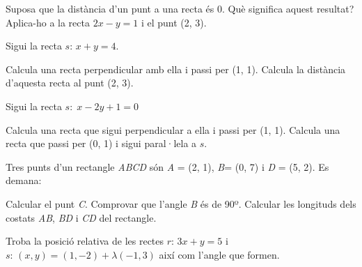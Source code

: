 \begin{activitats}
\begin{mylist}
		
		\exer  Suposa que la distància d'un punt a una recta és 0. Què significa aquest resultat? Aplica-ho a la recta $2x-y=1$ i el punt (2, 3).
		
		
		\exer  Sigui la recta $s:\, x+y=4$. 
		\begin{tasks}
			\task  Calcula una recta perpendicular amb ella i passi per (1, 1). 
			\task  Calcula la distància d'aquesta recta al punt (2, 3).
		\end{tasks}
	
		\answers[cols=1]{[$y=x$, $d=\dfrac{|2-3|}{\sqrt{1^2+1^2}}=\frac{\sqrt{2}}{2}$]}

	
	\exer  Sigui la recta $s:\; x-2y+1=0$ 
	
	\begin{tasks}
		\task  Calcula una recta que sigui perpendicular a ella i passi per (1, 1).
		\task  Calcula una recta que passi per (0, 1) i sigui paral·lela a  $s$.
	\end{tasks}
	
	\answers{[$2x+y+3=0$, $x-2y+2=0$]}

	\exer  Tres punts d'un rectangle \textit{ABCD} són \linebreak \textit{A} = (2, 1), \textit{B}= (0, 7) i \textit{D} = (5, 2). Es demana:
	\begin{tasks}
		\task  Calcular el punt \textit{C}.
		\task  Comprovar que l'angle \textit{B} és de 90º.
		\task  Calcular les longituds dels costats \textit{AB}, \textit{BD} i \textit{CD} del rectangle.
	\end{tasks}

\answers[cols=1]{[$C(3,8)$, $\overrightarrow{BC}=(3,1)$ i $\overrightarrow{BA}=(2,-6)$. Es compleix que $(3,1)\cdot(2,-6)=0$ són perpendiculars, 
	$\overline{AB}=2\sqrt{10}$; $\overline{BD}=5\sqrt{2}$; $\overline{CD}=\overline{AB}=2\sqrt{10}$]}
	
		
		\exer  Troba la posició relativa de les rectes $r:\, 3x+y=5$ i $s:\, \left(x,y\right)=\left(1,-2\right)+\lambda \left(-1,3\right)$ així com l'angle que formen.
		
		

\end{mylist}
\end{activitats}
